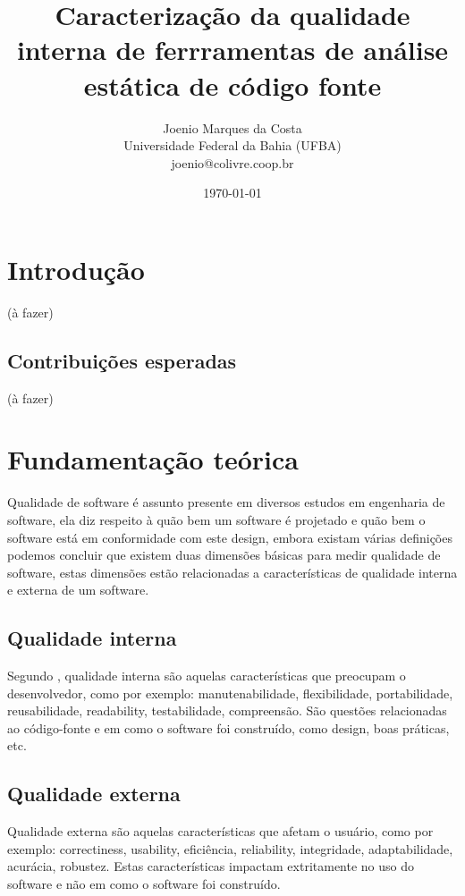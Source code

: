 \documentclass[12pt]{article}
\title{
  Caracterização da qualidade interna de ferrramentas de análise estática de
  código fonte
}
\author{Joenio Marques da Costa\\
  {\small Universidade Federal da Bahia (UFBA)} \\
  {\small joenio@colivre.coop.br}
}
\date{\today}
\begin{document}
\maketitle

\section{Introdução}

(à fazer)

\subsection{Contribuições esperadas}

(à fazer)

\section{Fundamentação teórica}

Qualidade de software é assunto presente em diversos estudos em engenharia de
software, ela diz respeito à quão bem um software é projetado e quão bem o
software está em conformidade com este design, embora existam várias
definições \cite{Kitchenham1996} \cite{McConnell2004} \cite{Iso25022}
\cite{WikiBooksSoftwareEngineering} \cite{Staines2015} podemos concluir que
existem duas dimensões básicas para medir qualidade de software,
estas dimensões estão relacionadas a características de qualidade interna e
externa de um software.

\subsection{Qualidade interna}

Segundo , qualidade interna são aquelas
características que preocupam o desenvolvedor, como por exemplo:
manutenabilidade, flexibilidade, portabilidade, reusabilidade, readability,
testabilidade, compreensão. São questões relacionadas ao código-fonte e em
como o software foi construído, como design, boas práticas, etc.

\subsection{Qualidade externa}

Qualidade externa são aquelas características que afetam o usuário, como por
exemplo: correctiness, usability, eficiência, reliability, integridade,
adaptabilidade, acurácia, robustez. Estas características impactam
extritamente no uso do software e não em como o software foi construído.
\end{document}
